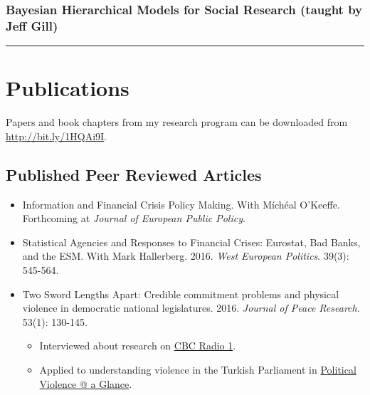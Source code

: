 \documentclass[a4paper]{article}
\begin{document}
{\subsubsection*{Bayesian Hierarchical Models for Social Research (taught by Jeff Gill)}

\vspace{0.25cm}
\medskip\hrule height 1pt
\vspace{0.5cm}


\section*{Publications}

\noindent Papers and book chapters from my research program can be downloaded from {\url{http://bit.ly/1HQAi9I}}.

\subsection*{Published Peer Reviewed Articles}

\begin{itemize}

    \item Information and Financial Crisis Policy Making. With M\'{i}ch\'{e}al O'Keeffe. Forthcoming at \emph{Journal of European Public Policy}.

    \item Statistical Agencies and Responses to Financial Crises: Eurostat, Bad Banks, and the ESM. With Mark Hallerberg. 2016. {\emph{West European Politics}}. 39(3): 545-564.

    \item Two Sword Lengths Apart: Credible commitment problems and physical violence in democratic national legislatures. 2016. \emph{Journal of Peace Research}. 53(1): 130-145.

        \begin{itemize}
            \item Interviewed about research on \href{http://www.cbc.ca/radio/day6/episode-286-parliamentary-brawls-transgender-rights-the-raptors-secret-weapon-migrant-ships-and-more-1.3591232/you-thought-elbowgate-was-bad-check-out-these-political-brawls-1.3591248}{CBC Radio 1}.

            \item Applied to understanding violence in the Turkish Parliament in \href{https://politicalviolenceataglance.org/2016/05/27/brawl-in-turkish-national-assembly-indicates-deeper-trouble/}{Political Violence @ a Glance}.


\end{itemize}
\end{itemize}}
\end{document}
